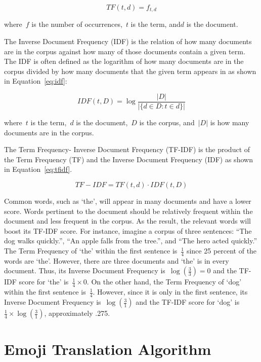 \documentclass{article}[10]
\begin{document}
\begin{equation}
  TF(t, d) = f_{t, d} \label{eq:tf}
\end{equation}

where~\(f\) is the number of occurrences,~\(t\) is the term, and\(d\) is
the document.

The Inverse Document Frequency (IDF) is the relation of how many
documents are in the corpus against how many of those documents contain
a given term. The IDF is often defined as the logarithm of how many
documents are in the corpus divided by how many documents that the given
term appears in as shown in Equation~\eqref{eq:idf}:

\begin{equation}
  IDF(t, D) = \log\frac{|D|}{|\{d \in D : t \in d\}|} \label{eq:idf}
\end{equation}

where~\(t\) is the term,~\(d\) is the
document,~\(D\) is the corpus, and~\(\left|D\right|\) is
how many documents are in the corpus.

The Term Frequency- Inverse Document Frequency (TF-IDF) is the product
of the Term Frequency (TF) and the Inverse Document Frequency (IDF) as
shown in Equation~\eqref{eq:tfidf}.

\begin{equation}
  TF-IDF= TF(t, d) \cdot IDF(t, D) \label{eq:tfidf}
\end{equation}

Common words, such as `the', will appear in many documents and have a
lower score. Words pertinent to the document should be relatively
frequent within the document and less frequent in the corpus. As the
result, the relevant words will boost its TF-IDF score. For instance,
imagine a corpus of three sentences: ``The dog walks quickly.'', ``An
apple falls from the tree.'', and ``The hero acted quickly.'' The Term
Frequency of `the' within the first sentence is~\(\frac{1}{4}\)
since 25 percent of the words are `the'. However, there are three
documents and `the' is in every document. Thus, its Inverse Document
Frequency is~\(\log(\frac{3}{3}) = 0\) and the TF-IDF score for `the'
is~\(\frac{1}{4} \times 0\). On the other hand, the Term Frequency of `dog'
within the first sentence is~\(\frac{1}{4}\). However, since it is
only in the first sentence, its Inverse Document Frequency
is~\(\log(\frac{3}{1})\) and the TF-IDF score for `dog'
is~\(\frac{1}{4} \times \log(\frac{3}{1})\), approximately .275.

\section{Emoji Translation Algorithm\label{sec:EmojiTranslationAlgorithm}}
\end{document}
